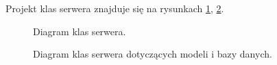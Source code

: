 \documentclass[a4paper,11pt,twoside]{report}
\theoremstyle{definition}
\begin{document}
Projekt klas serwera znajduje się na rysunkach \ref{server-class-1}, \ref{server-class-2}.

\begin{figure}[H] 
	\caption{Diagram klas serwera.}
	\label{server-class-1}
\end{figure}

\begin{figure}[H] 
	\caption{Diagram klas serwera dotyczących modeli i bazy danych.}
	\label{server-class-2}
\end{figure}
\end{document}
